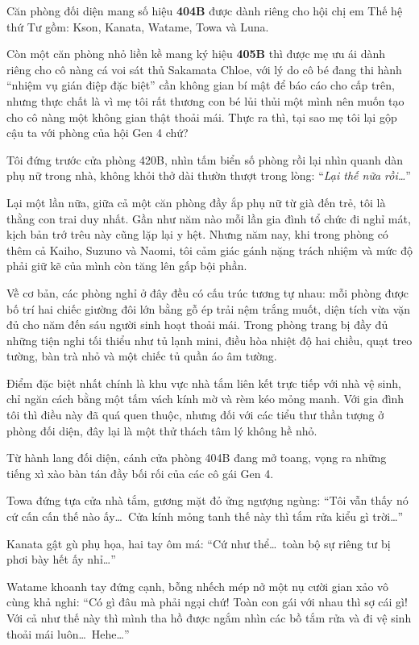 \documentclass[../main.tex]{subfiles}
\begin{document}
Căn phòng đối diện mang số hiệu \textbf{404B} được dành riêng cho hội chị em Thế hệ thứ Tư gồm: Kson, Kanata, Watame, Towa và Luna.

Còn một căn phòng nhỏ liền kề mang ký hiệu \textbf{405B} thì được mẹ ưu ái dành riêng cho cô nàng cá voi sát thủ Sakamata Chloe, với lý do cô bé đang thi hành ``nhiệm vụ gián điệp đặc biệt'' cần không gian bí mật để báo cáo cho cấp trên, nhưng thực chất là vì mẹ tôi rất thương con bé lủi thủi một mình nên muốn tạo cho cô nàng một không gian thật thoải mái. Thực ra thì, tại sao mẹ tôi lại gộp cậu ta với phòng của hội Gen 4 chứ?

Tôi đứng trước cửa phòng 420B, nhìn tấm biển số phòng rồi lại nhìn quanh dàn phụ nữ trong nhà, không khỏi thở dài thườn thượt trong lòng: ``\textit{Lại thế nữa rồi\dots}''

Lại một lần nữa, giữa cả một căn phòng đầy ắp phụ nữ từ già đến trẻ, tôi là thằng con trai duy nhất. Gần như năm nào mỗi lần gia đình tổ chức đi nghỉ mát, kịch bản trớ trêu này cũng lặp lại y hệt. Nhưng năm nay, khi trong phòng có thêm cả Kaiho, Suzuno và Naomi, tôi cảm giác gánh nặng trách nhiệm và mức độ phải giữ kẽ của mình còn tăng lên gấp bội phần.

Về cơ bản, các phòng nghỉ ở đây đều có cấu trúc tương tự nhau: mỗi phòng được bố trí hai chiếc giường đôi lớn bằng gỗ ép trải nệm trắng muốt, diện tích vừa vặn đủ cho năm đến sáu người sinh hoạt thoải mái. Trong phòng trang bị đầy đủ những tiện nghi tối thiểu như tủ lạnh mini, điều hòa nhiệt độ hai chiều, quạt treo tường, bàn trà nhỏ và một chiếc tủ quần áo âm tường.

Điểm đặc biệt nhất chính là khu vực nhà tắm liên kết trực tiếp với nhà vệ sinh, chỉ ngăn cách bằng một tấm vách kính mờ và rèm kéo mỏng manh. Với gia đình tôi thì điều này đã quá quen thuộc, nhưng đối với các tiểu thư thần tượng ở phòng đối diện, đây lại là một thử thách tâm lý không hề nhỏ.

Từ hành lang đối diện, cánh cửa phòng 404B đang mở toang, vọng ra những tiếng xì xào bàn tán đầy bối rối của các cô gái Gen 4.

Towa đứng tựa cửa nhà tắm, gương mặt đỏ ửng ngượng ngùng: ``Tôi vẫn thấy nó cứ cấn cấn thế nào ấy\dots\ Cửa kính mỏng tanh thế này thì tắm rửa kiểu gì trời\dots''

Kanata gật gù phụ họa, hai tay ôm má: ``Cứ như thể\dots\ toàn bộ sự riêng tư bị phơi bày hết ấy nhỉ\dots''

Watame khoanh tay đứng cạnh, bỗng nhếch mép nở một nụ cười gian xảo vô cùng khả nghi: ``Có gì đâu mà phải ngại chứ! Toàn con gái với nhau thì sợ cái gì! Với cả như thế này thì mình tha hồ được ngắm nhìn các bồ tắm rửa và đi vệ sinh thoải mái luôn\dots\ Hehe\dots''
\end{document}
